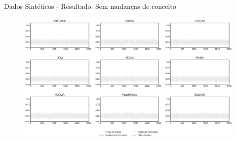 \documentclass[10pt]{beamer}
\begin{document}
\begin{frame}{Dados Sintéticos - Resultado: Sem mudanças de conceito}
    \begin{figure}[t]
        \begin{center}
            \includegraphics[width=\textwidth]{imagens/nochange.png}
        \end{center}
    \end{figure}
\end{frame}
\end{document}
